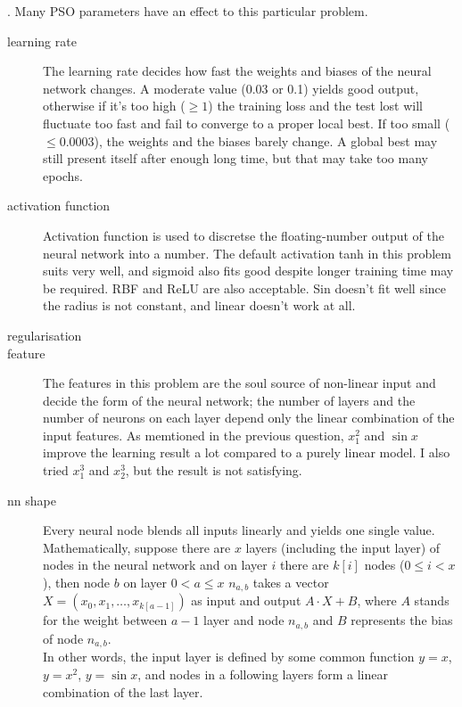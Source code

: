 \documentclass[12pt]{article}
\begin{document}
. Many PSO parameters have an effect to this particular problem.
\begin{description}
    \item[learning rate] The learning rate decides how fast the weights and biases of the neural network changes. A moderate value (0.03 or 0.1) yields good output, otherwise if it's too high ($\geq 1$) the training loss and the test lost will fluctuate too fast and fail to converge to a proper local best. If too small ($\leq 0.0003$), the weights and the biases barely change. A global best may still present itself after enough long time, but that may take too many epochs.
    \item[activation function] Activation function is used to discretse the floating-number output of the neural network into a number. The default activation tanh in this problem suits very well, and sigmoid also fits good despite longer training time may be required. RBF and ReLU are also acceptable. Sin doesn't fit well since the radius is not constant, and linear doesn't work at all.
    \item[regularisation]
    \item[feature] The features in this problem are the soul source of non-linear input and decide the form of the neural network; the number of layers and the number of neurons on each layer depend only the linear combination of the input features. As memtioned in the previous question, $x_1^2$ and $\sin x$ improve the learning result a lot compared to a purely linear model. I also tried $x_1^3$ and $x_2^3$, but the result is not satisfying.
    \item[nn shape] Every neural node blends all inputs linearly and yields one single value. Mathematically, suppose there are $x$ layers (including the input layer) of nodes in the neural network and on layer $i$ there are $k[i]$ nodes ($0\leq i<x$), then node $b$ on layer $0<a\leq x$ $n_{a,b}$ takes a vector 
    $X=(x_0,x_1,\ldots,x_{k[a-1]})$ as input and output $A\cdot X+B$, where $A$ stands for the weight between $a-1$ layer and node $n_{a,b}$ and $B$ represents the bias of node $n_{a,b}$.\\
    In other words, the input layer is defined by some common function $y=x$, $y=x^2$, $y=\sin x$, and nodes in a following layers form a linear combination of the last layer.
    
      
\end{description}
\end{document}
